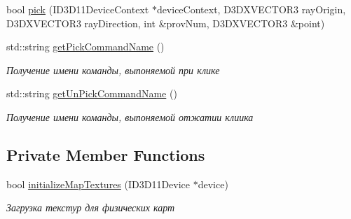 \begin{DoxyCompactItemize}
bool \hyperlink{class_terrain_manager_class_ab31277349a6ec0c679f7f8a78dc5f887}{pick} (I\+D3\+D11\+Device\+Context $\ast$device\+Context, D3\+D\+X\+V\+E\+C\+T\+O\+R3 ray\+Origin, D3\+D\+X\+V\+E\+C\+T\+O\+R3 ray\+Direction, int \&prov\+Num, D3\+D\+X\+V\+E\+C\+T\+O\+R3 \&point)
\item 
std\+::string \hyperlink{class_terrain_manager_class_ac9869f8c707175c0e176f4587154b58d}{get\+Pick\+Command\+Name} ()
\begin{DoxyCompactList}\small\item\em Получение имени команды, выпоняемой при клике \end{DoxyCompactList}\item 
std\+::string \hyperlink{class_terrain_manager_class_a050bcf5aeb0a9cf73434144894867abc}{get\+Un\+Pick\+Command\+Name} ()
\begin{DoxyCompactList}\small\item\em Получение имени команды, выпоняемой отжатии клиика \end{DoxyCompactList}\end{DoxyCompactItemize}
\subsection*{Private Member Functions}
\begin{DoxyCompactItemize}
\item 
bool \hyperlink{class_terrain_manager_class_a923a343b6c7e8fe6fd318933642e4bcb}{initialize\+Map\+Textures} (I\+D3\+D11\+Device $\ast$device)
\begin{DoxyCompactList}\small\item\em Загрузка текстур для физических карт \end{DoxyCompactList}\end{DoxyCompactItemize}
